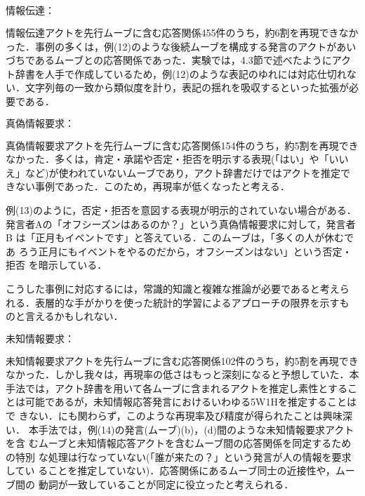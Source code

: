 \begin{description}

\item{\boldmath $情報伝達：$} 

情報伝達アクトを先行ムーブに含む応答関係455件のうち，約6割を再現できなか
った．事例の多くは，例(12)のような後続ムーブを構成する発言のアクトがあい
づちであるムーブとの応答関係であった．実験では，4.3節で述べたようにアク
ト辞書を人手で作成しているため，例(12)のような表記のゆれには対応仕切れな
い．文字列毎の一致から類似度を計り，表記の揺れを吸収するといった拡張が必
要である．


\item{\boldmath $真偽情報要求：$} 

真偽情報要求アクトを先行ムーブに含む応答関係154件のうち，約5割を再現でき
なかった．多くは，肯定・承諾や否定・拒否を明示する表現(「はい」や「いい
え」など)が使われていないムーブであり，アクト辞書だけではアクトを推定で
きない事例であった．このため，再現率が低くなったと考える．

例(13)のように，否定・拒否を意図する表現が明示的されていない場合がある．
発言者Aの「オフシーズンはあるのか？」という真偽情報要求に対して，発言者B
は「正月もイベントです」と答えている．このムーブは，「多くの人が休むであ
ろう正月にもイベントをやるのだから，オフシーズンはない」という否定・拒否
を暗示している．


こうした事例に対応するには，常識的知識と複雑な推論が必要であると考えら
れる．表層的な手がかりを使った統計的学習によるアプローチの限界を示すも
のと言えるかもしれない．

\item{\boldmath $未知情報要求：$} 

未知情報要求アクトを先行ムーブに含む応答関係102件のうち，約5割を再現でき
なかった．しかし我々は，再現率の低さはもっと深刻になると予想していた．本
手法では，アクト辞書を用いて各ムーブに含まれるアクトを推定し素性とするこ
とは可能であるが，未知情報応答発言におけるいわゆる5W1Hを推定することはで
きない．にも関わらず，このような再現率及び精度が得られたことは興味深い．
本手法では，例(14)の発言(ムーブ)(b)，(d)間のような未知情報要求アクトを含
むムーブと未知情報応答アクトを含むムーブ間の応答関係を同定するための特別
な処理は行なっていない(「誰が来たの？」という発言が人の情報を要求してい
ることを推定していない)．応答関係にあるムーブ同士の近接性や，ムーブ間の
動詞が一致していることが同定に役立ったと考えられる．


\end{description}

